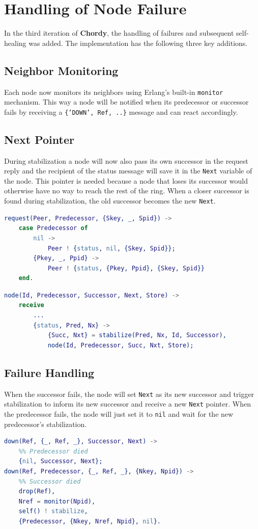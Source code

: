 \documentclass[a4paper, 11pt]{article}
\begin{document}
\section{Handling of Node Failure}
In the third iteration of \textbf{Chordy}, the handling of failures and subsequent self-healing was added. The implementation has the following three key additions.
\subsection{Neighbor Monitoring}
Each node now monitors its neighbors using Erlang's built-in \texttt{monitor} mechanism. This way a node will be notified when its predecessor or successor fails by receiving a \texttt{\{'DOWN', Ref, ..\}} message and can react accordingly.
\subsection{Next Pointer}
During stabilization a node will now also pass its own successor in the request reply and the recipient of the status message will save it in the \texttt{Next} variable of the node. This pointer is needed because a node that loses its successor would otherwise have no way to reach the rest of the ring. When a closer successor is found during stabilization, the old successor becomes the new \texttt{Next}.
\begin{lstlisting}[language=erlang]
request(Peer, Predecessor, {Skey, _, Spid}) ->
    case Predecessor of
        nil ->
            Peer ! {status, nil, {Skey, Spid}};
        {Pkey, _, Ppid} ->
            Peer ! {status, {Pkey, Ppid}, {Skey, Spid}}
    end.
\end{lstlisting}
\begin{lstlisting}[language=erlang]
node(Id, Predecessor, Successor, Next, Store) ->
    receive
        ...
        {status, Pred, Nx} ->
            {Succ, Nxt} = stabilize(Pred, Nx, Id, Successor),
            node(Id, Predecessor, Succ, Nxt, Store);
\end{lstlisting}
\subsection{Failure Handling}
When the successor fails, the node will set \texttt{Next} as its new successor and trigger stabilization to inform its new successor and receive a new \texttt{Next} pointer. When the predecessor fails, the node will just set it to \texttt{nil} and wait for the new predecessor's stabilization.
\begin{lstlisting}[language=erlang]
down(Ref, {_, Ref, _}, Successor, Next) ->
    %% Predecessor died
    {nil, Successor, Next};
down(Ref, Predecessor, {_, Ref, _}, {Nkey, Npid}) ->
    %% Successor died
    drop(Ref),
    Nref = monitor(Npid),
    self() ! stabilize,
    {Predecessor, {Nkey, Nref, Npid}, nil}.
\end{lstlisting}
\end{document}
